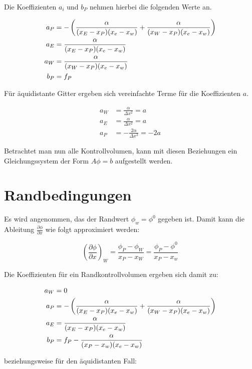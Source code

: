 \documentclass[10pt, ngerman,colorback,accentcolor=tud2d]{tudreport}
\begin{document}
Die Koeffizienten $a_i$ und $b_P$ nehmen hierbei die folgenden Werte an.

\begin{align*}
  a_P &= -\left( \frac{\alpha}{(x_E-x_P) (x_e-x_w)} + \frac{\alpha}{(x_W-x_P) (x_e-x_w)} \right) \\
a_E &= \frac{\alpha}{(x_E-x_P) (x_e-x_w)}\\
a_W &= \frac{\alpha}{(x_W-x_P) (x_e-x_w)}\\
b_P &= f_P
\end{align*}

Für äquidistante Gitter ergeben sich vereinfachte Terme für die Koeffizienten $a$.

\begin{align*}
  a_W &= \frac{\alpha}{\Delta x^2} = a\\
  a_E &= \frac{\alpha}{\Delta x^2} = a\\
  a_P &= - \frac{2 \alpha}{\Delta x^2} = -2a
\end{align*}

Betrachtet man nun alle Kontrollvolumen, kann mit diesen Beziehungen ein 
Gleichungssystem der Form $A\phi = b$ aufgestellt werden.

\section{Randbedingungen}
\label{sec:Randbedingungen}

Es wird angenommen, das der Randwert $\phi_w= \phi^0$ gegeben ist. Damit kann die
Ableitung $\frac{\partial \phi}{\partial x}$ wie folgt approximiert werden:

\begin{equation*}
\left(\frac{\partial \phi}{\partial x}\right)_W = \frac{\phi_P - \phi_W}{x_P - x_W} =
  \frac{\phi_P - \phi^0}{x_P - x_w}
\end{equation*}

Die Koeffizienten für ein Randkontrollvolumen ergeben sich damit zu:

\begin{align*}
  a_W &= 0\\
  a_P &=  -\left( \frac{\alpha}{(x_E-x_P) (x_e-x_w)} + \frac{\alpha}{(x_W-x_P) (x_e-x_w)} \right) \\
  a_E &= \frac{\alpha}{(x_E-x_P) (x_e-x_w)}\\
  b_P &= f_P - \frac{\alpha}{(x_P -x_w)(x_e-x_w)}
\end{align*}

beziehungsweise für den äquidistanten Fall:
\end{document}
